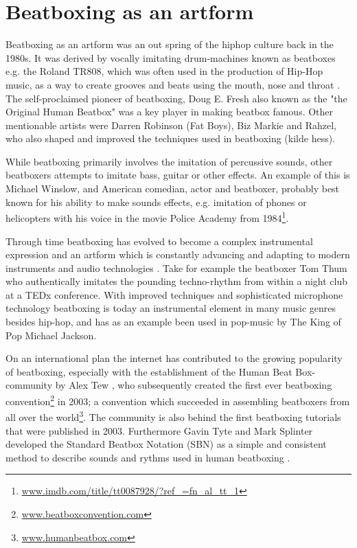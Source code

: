 \section{Beatboxing as an artform}
Beatboxing as an artform was an out spring of the hiphop culture back in the 1980s. It was derived by vocally imitating drum-machines known as beatboxes e.g. the Roland TR808, which was often used in the production of Hip-Hop music, as a way to create grooves and beats using the mouth, nose and throat \citep{proctor2012}. The self-proclaimed pioneer of beatboxing, Doug E. Fresh also known as the "the Original Human Beatbox" was a key player in making beatbox famous. Other mentionable artists were Darren Robinson (Fat Boys), Biz Markie and Rahzel, who also shaped and improved the techniques used in beatboxing (kilde hess).

While beatboxing primarily involves the imitation of percussive sounds, other beatboxers attempts to imitate bass, guitar or other effects. An example of this is Michael Winslow, and American comedian, actor and beatboxer, probably best known for his ability to make sounds effects, e.g. imitation of phones or helicopters with his voice in the movie Police Academy from 1984\footnote{\url{www.imdb.com/title/tt0087928/?ref_=fn_al_tt_1}}. 

Through time beatboxing has evolved to become a complex instrumental expression and an artform which is constantly advancing and adapting to modern instruments and audio technologies \citep{proctor2012}. Take for example the beatboxer Tom Thum who authentically imitates the pounding techno-rhythm from within a night club at a TEDx conference\citep{TEDx}. With improved techniques and sophisticated microphone technology beatboxing is today an instrumental element in many music genres besides hip-hop, and has as an example been used in pop-music by The King of Pop Michael Jackson\citep{MJ}.

On an international plan the internet has contributed to the growing popularity of beatboxing, especially with the establishment of the Human Beat Box-community by Alex Tew , who subsequently created the first ever beatboxing convention\footnote{\url{www.beatboxconvention.com}} in 2003; a convention which succeeded in assembling beatboxers from all over the world\footnote{\url{www.humanbeatbox.com}}.
The community is also behind the first beatboxing tutorials that were published in 2003. Furthermore Gavin Tyte and Mark Splinter developed the Standard Beatbox Notation (SBN) as a simple and consistent method to describe sounds and rythms used in human beatboxing \citep{Tyte}.
